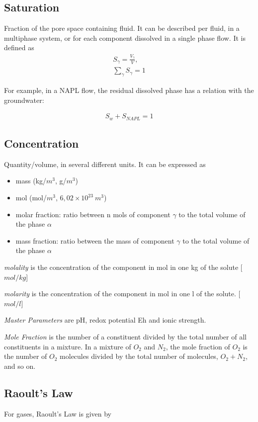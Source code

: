 \documentclass[11pt,twoside]{report}
\begin{document}
\subsection{Saturation}
Fraction of the pore space containing fluid. It can be described per fluid, in a multiphase system, or for each component dissolved in a single phase flow. It is defined as 
\begin{align}
   S_{\gamma} = \frac{V_{\gamma}}{V}, \\
   \sum_{\gamma}S_{\gamma} = 1
\end{align}

For example, in a NAPL flow, the residual dissolved phase has a relation with the groundwater:

\begin{align}
   S_{w} + S_{NAPL} = 1
\end{align}


\subsection{Concentration}
Quantity/volume, in several different units. It can be expressed as
\begin{itemize}
   \item mass (kg/$m^{3}$, g/$m^{3}$)
   \item mol (mol/$m^{3}$, $6,02 \times 10^{23} \ m^{3}$)
   \item molar fraction: ratio between n mols of component $\gamma$ to the total volume of the phase $\alpha$
   \item mass fraction: ratio between the mass of component $\gamma$ to the total volume of the phase $\alpha$
\end{itemize}

\textit{molality} is the concentration of the component in mol in one kg of the solute [$mol/kg$] 

\textit{molarity} is the concentration of the component in mol in one l of the solute. [$mol/l$]

\textit{Master Parameters} are pH, redox potential Eh and ionic strength. 

\textit{Mole Fraction} is the number of a constituent divided by the total number of all constituents in a mixture. In a mixture of $O_{2}$ and $N_{2}$, the mole fraction of $O_{2}$ is the number of $O_{2}$ molecules divided by the total number of molecules, $O_{2} + N_{2}$, and so on.

\subsection{Raoult's Law}
For gases, Raoult's Law is given by
\end{document}

